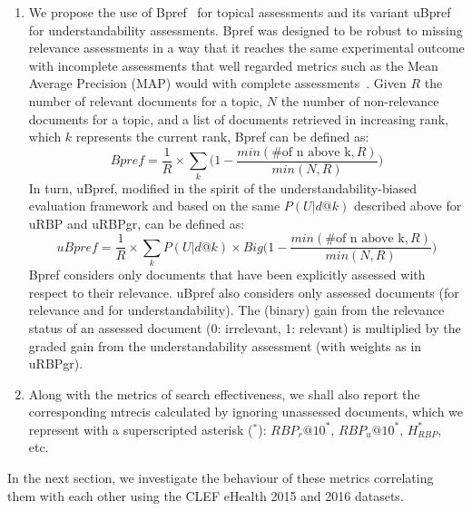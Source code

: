 \begin{enumerate}[leftmargin=*]

\item We propose the use of Bpref~\cite{craswell09} for topical assessments and its variant uBpref~\cite{palotti16} for understandability assessments.
Bpref was designed to be robust to missing relevance assessments in a way that it reaches the same experimental outcome with incomplete assessments that well regarded metrics such as the Mean Average Precision (MAP) would with complete assessments~\cite{craswell09}. Given $R$ the number of relevant documents for a topic, $N$ the number of non-relevance documents for a topic, and a list of documents retrieved in increasing rank, which $k$ represents the current rank, Bpref can be defined as:
%
\begin{equation}
%
Bpref = \frac{1}{R} \times \sum_k \Big( 1 - \frac{min(\text{\# of n above k}, R)}{min(N,R)} \Big)
%
\label{eq:RBP}
\end{equation}
%
In turn, uBpref, modified in the spirit of the understandability-biased evaluation framework and based on the same $P(U|d@k)$ described above for uRBP and uRBPgr, can be defined as:
%
\begin{equation}
%
uBpref = \frac{1}{R} \times \sum_k P(U|d@k) \times Big( 1 - \frac{min(\text{\# of n above k}, R) }{min(N,R)} \Big)  
%
\label{eq:RBP}
\end{equation}
%
Bpref considers only documents that have been explicitly assessed with respect to their relevance. uBpref also considers only assessed documents (for relevance and for understandability). The (binary) gain from the relevance status of an assessed document (0: irrelevant, 1: relevant) is multiplied by the graded gain from the understandability assessment (with weights as in uRBPgr).
%
\item Along with the metrics of search effectiveness, we shall also report the corresponding mtrecis calculated by ignoring unassessed documents, which we represent with a superscripted asterisk (\textbf{$^*$}): $RBP_r@10^*$, $RBP_u@10^*$, $H_{RBP}^*$, etc. 
%
\end{enumerate}
%
In the next section, we investigate the behaviour of these metrics correlating them with each other using the CLEF eHealth 2015 and 2016 datasets.

